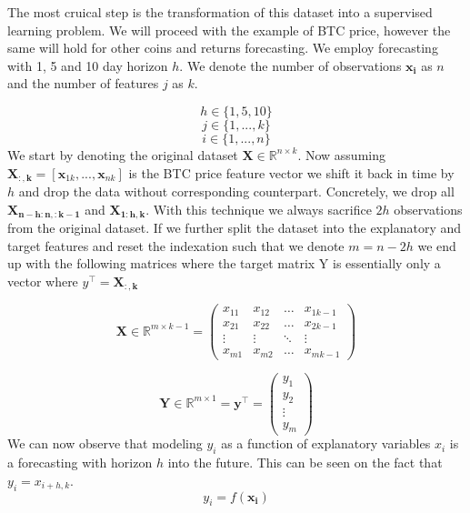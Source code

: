 The most cruical step is the transformation of this dataset into a supervised
learning problem. We will proceed with the example of BTC price, however
the same will hold for other coins and returns forecasting. We employ
forecasting with 1, 5 and 10 day horizon $h$. We denote the number 
of observations $\mathbf{x_{i}}$
as $n$ and the number of features $j$ as $k$.

\begin{equation}\label{eq:horizon}
    h \in \{1,5,10\}
\end{equation}
\begin{equation}\label{eq:features}
    j \in \{1,...,k\}
\end{equation}
\begin{equation}\label{eq:observations}
    i \in \{1,...,n\}
\end{equation}
We start by denoting
the original dataset $\mathbf{X} \in \mathbb{R}^{n \times k}$.
Now assuming $\mathbf{X_{:,k}} = [\mathbf{x}_{1k},...,\mathbf{x}_{nk}]$ 
is the \ac{BTC} price feature vector we shift it
back in time by $h$ and drop the data without corresponding counterpart. 
Concretely, we drop all 
$\mathbf{X_{n-h:n,:k-1}}$ and $\mathbf{X_{1:h,k}}$.
With this technique we always sacrifice $2h$ observations from the original dataset.
If we further split the dataset into the explanatory and target features
and reset the indexation such that we denote $m = n-2h$
we end up with the following matrices where the target matrix Y is essentially
only a vector where $y^\top = \mathbf{X_{:,k}}$


\begin{equation}\label{eq:explanatory}
    \mathbf{X} \in \mathbb{R}^{m \times {k-1}} = 
    \begin{pmatrix}
        x_{11} & x_{12} & \dots  & x_{1k-1} \\
        x_{21} & x_{22} & \dots  & x_{2k-1} \\
        \vdots & \vdots & \ddots & \vdots \\
        x_{m1} & x_{m2} & \dots  & x_{mk-1}
    \end{pmatrix}
\end{equation}

\begin{equation}\label{eq:target}
    \mathbf{Y} \in \mathbb{R}^{m \times 1} = \mathbf{y^\top} = 
\begin{pmatrix}
    y_{1}\\
    y_{2}\\
    \vdots  \\
    y_{m} 
\end{pmatrix}
\end{equation}
We can now observe that modeling $y_i$ as a function of
explanatory variables $x_{i}$ is a forecasting with horizon $h$ into the future.
This can be seen on the fact that $y_i = x_{i+h,k}$.
\begin{equation}\label{eq:model_simple}
    y_i = f(\mathbf{x_{i}})
\end{equation}



